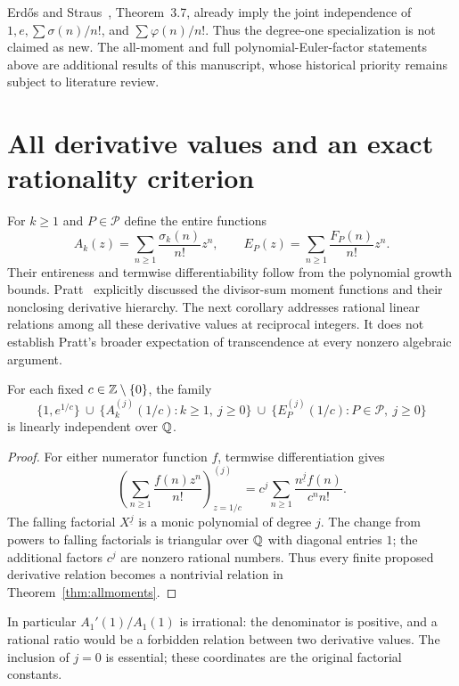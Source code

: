 Erd\H{o}s and Straus~\cite{ES74}, Theorem~3.7, already imply the
joint independence of $1,e,\sum\sigma(n)/n!$, and
$\sum\varphi(n)/n!$. Thus the degree-one specialization is not
claimed as new. The all-moment and full polynomial-Euler-factor
statements above are additional results of this manuscript, whose
historical priority remains subject to literature review.

\section{All derivative values and an exact rationality criterion}
\label{sec:derivatives}
For $k\geq1$ and $P\in\mathcal P$ define the entire functions
\[
 A_k(z)=\sum_{n\geq1}\frac{\sigma_k(n)}{n!}z^n,
 \qquad E_P(z)=\sum_{n\geq1}\frac{F_P(n)}{n!}z^n.
\]
Their entireness and termwise differentiability follow from the
polynomial growth bounds. Pratt~\cite{Pratt} explicitly discussed
the divisor-sum moment functions and their nonclosing derivative
hierarchy. The next corollary addresses rational linear relations
among all these derivative values at reciprocal integers. It does
not establish Pratt's broader expectation of transcendence at every
nonzero algebraic argument.

\begin{corollary}
\label{cor:derivatives}
For each fixed $c\in\mathbb Z\setminus\{0\}$, the family
\[
 \{1,e^{1/c}\}\ \cup\
 \{A_k^{(j)}(1/c):k\geq1,\ j\geq0\}
 \ \cup\
 \{E_P^{(j)}(1/c):P\in\mathcal P,\ j\geq0\}
\]
is linearly independent over $\mathbb Q$.
\end{corollary}
\begin{proof}
For either numerator function $f$, termwise differentiation gives
\[
 \left(\sum_{n\geq1}\frac{f(n)z^n}{n!}\right)^{(j)}_{z=1/c}
 =c^j\sum_{n\geq1}\frac{n^{\underline j}f(n)}{c^n n!}.
\]
The falling factorial $X^{\underline j}$ is a monic polynomial of
degree $j$. The change from powers to falling factorials is triangular
over $\mathbb Q$ with diagonal entries $1$; the additional factors $c^j$
are nonzero rational numbers. Thus every finite proposed derivative
relation becomes a nontrivial relation in Theorem~\ref{thm:allmoments}.
\end{proof}

In particular $A_1'(1)/A_1(1)$ is irrational: the denominator is
positive, and a rational ratio would be a forbidden relation between
two derivative values. The inclusion of $j=0$ is essential; these
coordinates are the original factorial constants.

